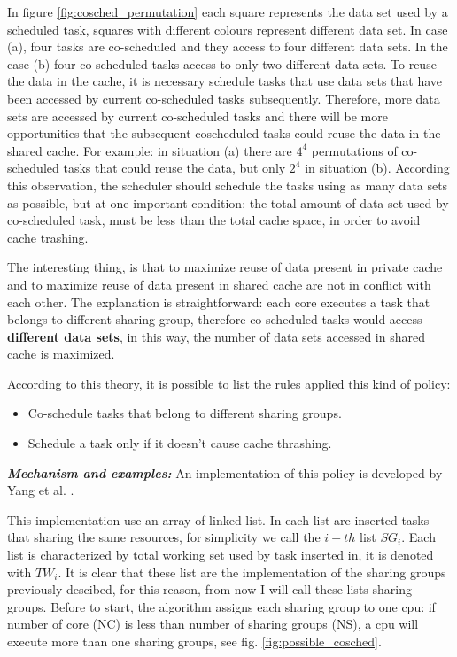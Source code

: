 \begin{description}
In figure \ref{fig:cosched_permutation} each square represents the data set used by a scheduled task, squares with different colours represent different 
data set. In case (a), four tasks are co-scheduled and they access to four different data sets. In the case (b) four co-scheduled tasks access to only two 
different data sets. To reuse the data in the cache, it is necessary schedule tasks that use data sets that have been accessed by current co-scheduled 
tasks subsequently. Therefore, more data sets are accessed by current co-scheduled tasks and there will be more opportunities that the subsequent 
coscheduled tasks could reuse the data in the shared cache. For example: in situation (a) there are $4^4$ permutations of co-scheduled tasks that could 
reuse the data, but only $2^4$ in situation (b). According this observation, the scheduler should schedule the tasks using as many data sets as possible, 
but at one important condition: the total amount of data set used by co-scheduled task, must be less than the total cache space, in order to avoid cache 
trashing.

The interesting thing, is that to maximize reuse of data present in private cache and to maximize reuse of data present in shared cache are not in conflict
with each other. The explanation is straightforward: each core executes a task that belongs to different sharing group, therefore co-scheduled tasks would 
access \textbf{different data sets}, in this way, the number of data sets accessed in shared cache is maximized.

According to this theory, it is possible to list the rules applied this kind of policy:

\begin{itemize}
	\item Co-schedule tasks that belong to different sharing groups. 
	\item Schedule a task only if it doesn't cause cache thrashing.
\end{itemize}

\textit{\textbf{Mechanism and examples:}} An implementation of this policy is developed by Yang et al. \cite{taiwan}. 

This implementation use an array of linked list. In each list are inserted tasks that sharing the same resources, for simplicity we call the $i-th$ list 
$SG_i$. Each list is characterized by total working set used by task inserted in, it is denoted with $TW_i$. It is clear that these list are the 
implementation of the sharing groups previously descibed, for this reason, from now I will call these lists sharing groups. Before to start, the algorithm 
assigns each sharing group to one cpu: if number of core (NC) is less than number of sharing groups (NS), a cpu will execute more than one sharing groups, 
see fig. \ref{fig:possible_cosched}.


\end{description}
